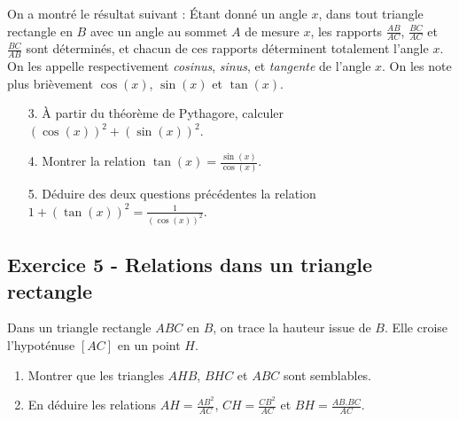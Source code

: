 \documentclass[12 pt]{extarticle}
\theoremstyle{plain}
\begin{document}
On a montré le résultat suivant : Étant donné un angle $x$, dans tout triangle rectangle en $B$ avec un angle au sommet $A$ de mesure $x$, les rapports $\frac{AB}{AC}$, $\frac{BC}{AC}$ et $\frac{BC}{AB}$ sont déterminés, et chacun de ces rapports déterminent totalement l'angle $x$. On les appelle respectivement \emph{cosinus}, \emph{sinus}, et \emph{tangente} de l'angle $x$. On les note plus brièvement $\cos(x)$, $\sin(x)$ et $\tan(x)$. 

\begin{enumerate}
\item[3.] À partir du théorème de Pythagore, calculer $(\cos(x))^2 + (\sin(x))^2$.
\item[4.] Montrer la relation $\tan(x)= \frac{\sin(x)}{\cos(x)}$. 
\item[5.] Déduire des deux questions précédentes la relation $1 + (\tan(x))^2 = \frac1{(\cos(x))^2}$. 
\end{enumerate}


\subsection*{Exercice 5 - Relations dans un triangle rectangle}


Dans un triangle rectangle $ABC$ en $B$, on trace la hauteur issue de $B$. Elle croise l'hypoténuse $[AC]$ en un point $H$. 
\begin{enumerate}
\item 
Montrer que les triangles $AHB$, $BHC$ et $ABC$ sont semblables.
\item En déduire les relations $AH = \frac{AB^2}{AC}$, $CH= \frac{CB^2}{AC}$ et $BH = \frac{AB.BC}{AC}$. 
\end{enumerate}
 	
\end{document}
